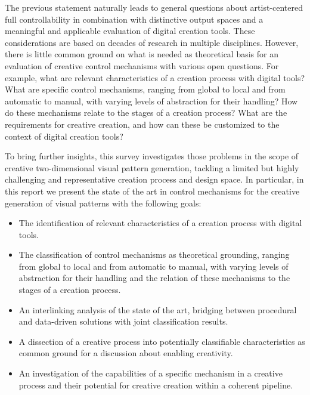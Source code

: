 The previous statement naturally leads to general questions about artist-centered full controllability in combination with distinctive output spaces and a meaningful and applicable evaluation of digital creation tools. These considerations are based on decades of research in multiple disciplines. However, there is little common ground on what is needed as theoretical basis for an evaluation of creative control mechanisms with various open questions. For example, what are relevant characteristics of a creation process with digital tools? What are specific control mechanisms, ranging from global to local and from automatic to manual, with varying levels of abstraction for their handling? How do these mechanisms relate to the stages of a creation process? What are the requirements for creative creation, and how can these be customized to the context of digital creation tools?

To bring further insights, this survey investigates those problems in the scope of creative two-dimensional visual pattern generation, tackling a limited but highly challenging and representative creation process and design space. In particular, in this report we present the state of the art in control mechanisms for the creative generation of visual patterns with the following goals:


\begin{itemize}
    \item The identification of relevant characteristics of a creation process with digital tools.
    \item The classification of control mechanisms as theoretical grounding, ranging from global to local and from automatic to manual, with varying levels of abstraction for their handling and the relation of these mechanisms to the stages of a creation process. 
    \item An interlinking analysis of the state of the art, bridging between procedural and data-driven solutions with joint classification results. 
    \item A dissection of a creative process into potentially classifiable characteristics as common ground for a discussion about enabling creativity.
    \item An investigation of the capabilities of a specific mechanism in a creative process and their potential for creative creation within a coherent pipeline.
\end{itemize}
